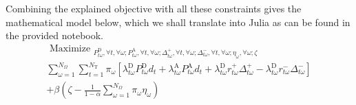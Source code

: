 Combining the explained objective with all these constraints gives the mathematical model below, which we shall translate into Julia as can be found in the provided notebook.  
\begin{equation}
\begin{array}{c}
\text { Maximize }_{P_{t \omega}^{\mathrm{D}}, \forall t, \forall \omega ; P_{t \omega}^{\mathrm{A}}, \forall t, \forall \omega ; \Delta_{t \omega}^{+}, \forall t, \forall \omega ; \Delta_{t \omega}^{-}, \forall t, \forall \omega ; \eta_{\omega}, \forall \omega ; \zeta} \\
\sum_{\omega=1}^{N_{\Omega}} \sum_{t=1}^{N_{\mathrm{T}}} \pi_{\omega}\left[\lambda_{t \omega}^{\mathrm{D}} P_{t \omega}^{\mathrm{D}} d_{t}+\lambda_{t \omega}^{\mathrm{A}} P_{t \omega}^{\mathrm{A}} d_{t}+\lambda_{t \omega}^{\mathrm{D}} r_{t \omega}^{+} \Delta_{t \omega}^{+}-\lambda_{t \omega}^{\mathrm{D}} r_{t \omega}^{-} \Delta_{t \omega}^{-}\right] 
\\+\beta\left(\zeta-\frac{1}{1-\alpha} \sum_{\omega=1}^{N_{\Omega}} \pi_{\omega} \eta_{\omega}\right)
\end{array}
\end{equation} 
